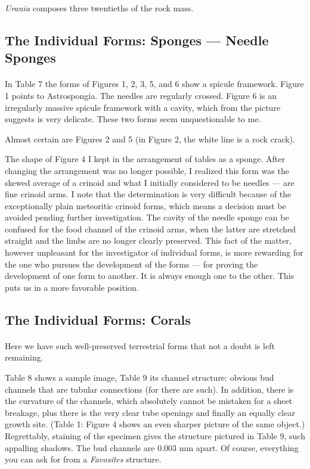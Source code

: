 \documentclass[a4paper, 12pt, oneside]{article}
\begin{document}
\emph{Urania} composes three twentieths of the rock mass.
\clearpage
\subsection{The Individual Forms: Sponges — Needle Sponges}
\paragraph{}
In Table 7 the forms of Figures 1, 2, 3, 5, and 6 show a spicule framework. Figure 1 points to Astrospongia. The needles are regularly crossed. Figure 6 is an irregularly massive spicule framework with a cavity, which from the picture suggests is very delicate. These two forms seem unquestionable to me.

Almost certain are Figures 2 and 5 (in Figure 2, the white line is a rock crack).

The shape of Figure 4 I kept in the arrangement of tables as a sponge. After changing the arrangement was no longer possible, I realized this form was the skewed average of a crinoid and what I initially considered to be needles — are fine crinoid arms. I note that the determination is very difficult because of the exceptionally plain meteoritic crinoid forms, which means a decision must be avoided pending further investigation. The cavity of the needle sponge can be confused for the food channel of the crinoid arms, when the latter are stretched straight and the limbs are no longer clearly preserved. This fact of the matter, however unpleasant for the investigator of individual forms, is more rewarding for the one who pursues the development of the forms — for proving the development of one form to another. It is always enough one to the other. This puts us in a more favorable position.
\clearpage
\subsection{The Individual Forms: Corals}
\paragraph{}
Here we have such well-preserved terrestrial forms that not a doubt is left remaining.

Table 8 shows a sample image, Table 9 its channel structure: obvious bud channels that are tubular connections (for there are such). In addition, there is the curvature of the channels, which absolutely cannot be mistaken for a sheet breakage, plus there is the very clear tube openings and finally an equally clear growth site. (Table 1: Figure 4 shows an even sharper picture of the same object.) Regrettably, staining of the specimen gives the structure pictured in Table 9, such appalling shadows. The bud channels are 0.003 mm apart. Of course, everything you can ask for from a \emph{Favosites} structure.
\end{document}
